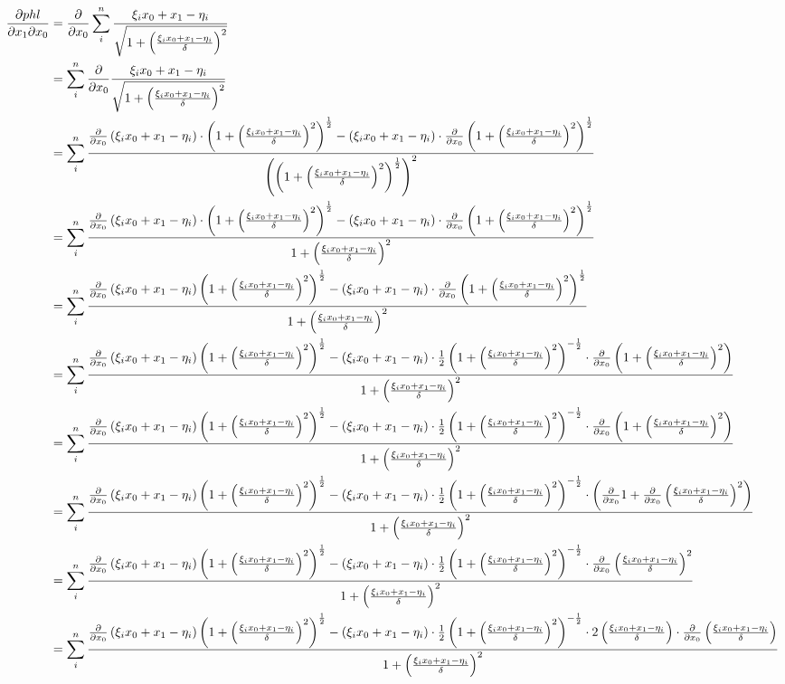 \documentclass[paper=A3, 
   paper=landscape,]{scrartcl}
\begin{document}
\begin{align*}
\frac{\partial phl}{\partial x_1 \partial x_0} &= \frac{\partial}{\partial x_0} \sum\limits_i^n \frac {\z}{\sqrt{1+ \left( \frac {\z}{\delta}\right)^2  }}\\
& =  \sum\limits_i^n \frac{\partial}{\partial x_0} \frac {\z}{\sqrt{1+ \left( \frac {\z}{\delta}\right)^2  }}\\
& = \sum\limits_i^n \frac { \frac{\partial}{\partial x_0} \left( \z \right) \cdot  \dfuncan - \left( \z \right) \cdot  \frac{\partial}{\partial x_0} \dfuncan } {\left( \dfuncan \right)^2}\\
& = \sum\limits_i^n \frac { \frac{\partial}{\partial x_0} \left( \z \right) \cdot  \dfuncan - \left( \z \right) \cdot  \frac{\partial}{\partial x_0} \dfuncan } {1+ \left( \frac {\z} {\delta} \right) ^2}\\
& = \sum\limits_i^n \frac { \frac{\partial}{\partial x_0} \left( \z \right) \dfuncan - \left( \z \right) \cdot  \frac{\partial}{\partial x_0} \dfuncan } {1+ \left( \frac {\z} {\delta} \right) ^2}\\
& = \sum\limits_i^n \frac {\frac{\partial}{\partial x_0} \left( \z \right) \dfuncan - \left( \z \right) \cdot \dfagain \cdot \frac{\partial}{\partial x_0} \left( 1+ \left( \frac{\xi_i x_0+x_1-\eta_i}{\delta} \right)^2 \right) } {1+ \left( \frac {\z} {\delta} \right) ^2}\\
& = \sum\limits_i^n \frac {\frac{\partial}{\partial x_0} \left( \z \right) \dfuncan - \left( \z \right) \cdot \dfagain \cdot \frac{\partial}{\partial x_0} \left( 1+ \left( \frac{\xi_i x_0+x_1-\eta_i}{\delta} \right)^2 \right) } {1+ \left( \frac {\z} {\delta} \right) ^2}\\
& = \sum\limits_i^n \frac {\frac{\partial}{\partial x_0} \left( \z \right) \dfuncan - \left( \z \right) \cdot \dfagain \cdot  \left( \frac{\partial}{\partial x_0}1+ \frac{\partial}{\partial x_0}\left( \frac{\xi_i x_0+x_1-\eta_i}{\delta} \right)^2 \right) } {1+ \left( \frac {\z} {\delta} \right) ^2}\\
& = \sum\limits_i^n \frac {\frac{\partial}{\partial x_0} \left( \z \right) \dfuncan - \left( \z \right) \cdot \dfagain \cdot   \frac{\partial}{\partial x_0}\left( \frac{\xi_i x_0+x_1-\eta_i}{\delta} \right)^2 } {1+ \left( \frac {\z} {\delta} \right) ^2}\\
& = \sum\limits_i^n \frac {\frac{\partial}{\partial x_0} \left( \z \right) \dfuncan - \left( \z \right) \cdot \dfagain \cdot  2\left( \frac{\xi_i x_0+x_1-\eta_i}{\delta} \right) \cdot  \frac{\partial}{\partial x_0} \left( \frac{\xi_i x_0+x_1-\eta_i}{\delta} \right) } {1+ \left( \frac {\z} {\delta} \right) ^2}\\

\end{align*}
\end{document}
